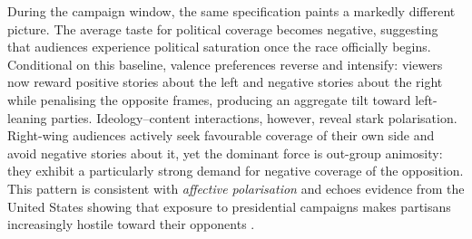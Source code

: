 \documentclass[12pt]{article}
\begin{document}
	During the campaign window, the same specification paints a markedly different picture. The average taste for political coverage becomes negative, suggesting that audiences experience political saturation once the race officially begins. Conditional on this baseline, valence preferences reverse and intensify: viewers now reward positive stories about the left and negative stories about the right while penalising the opposite frames, producing an aggregate tilt toward left-leaning parties. Ideology–content interactions, however, reveal stark polarisation. Right-wing audiences actively seek favourable coverage of their own side and avoid negative stories about it, yet the dominant force is out-group animosity: they exhibit a particularly strong demand for negative coverage of the opposition. This pattern is consistent with \emph{affective polarisation} and echoes evidence from the United States showing that exposure to presidential campaigns makes partisans increasingly hostile toward their opponents \citep{Peterson2017Echo}.
	
	
	
	
	
\end{document}
